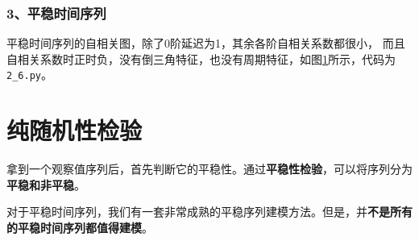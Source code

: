 \documentclass[12pt, a4paper, oneside]{ctexbook}
\begin{document}
\subsubsection{3、平稳时间序列}
平稳时间序列的自相关图，除了0阶延迟为1，其余各阶自相关系数都很小，
而且自相关系数时正时负，没有倒三角特征，也没有周期特征，如图\ref{im2_6}所示，代码为\texttt{2\_6.py}。

\begin{figure}[h]
    \centering
    \hfill
    \caption{}
    \label{im2_6}
\end{figure}

\section{纯随机性检验}
拿到一个观察值序列后，首先判断它的平稳性。通过\textbf{平稳性检验}，可以将序列分为\textbf{平稳和非平稳}。

对于平稳时间序列，我们有一套非常成熟的平稳序列建模方法。但是，并\textbf{不是所有的平稳时间序列都值得建模}。
\end{document}
